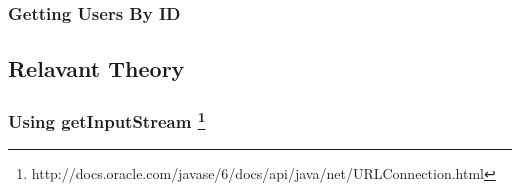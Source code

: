 \subsubsection*{Getting Users By ID}




\subsection*{Relavant Theory}


\subsubsection*{Using getInputStream \footnote{http://docs.oracle.com/javase/6/docs/api/java/net/URLConnection.html}}



